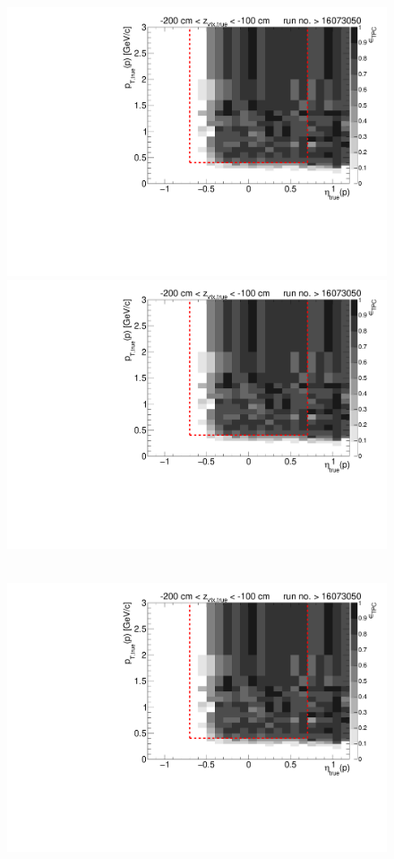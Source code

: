 \begin{figure}[hb]
{		\includegraphics[width=\linewidth,page=7]{graphics/eff/Eff2D_TPC_proton_Plus_RunRange2.pdf}\\
		\includegraphics[width=\linewidth,page=9]{graphics/eff/Eff2D_TPC_proton_Plus_RunRange2.pdf}
	}~
	\parbox{0.495\textwidth}{
		\centering
		\includegraphics[width=\linewidth,page=4]{graphics/eff/Eff2D_TPC_proton_Plus_RunRange2.pdf}\\
}
\end{figure}
